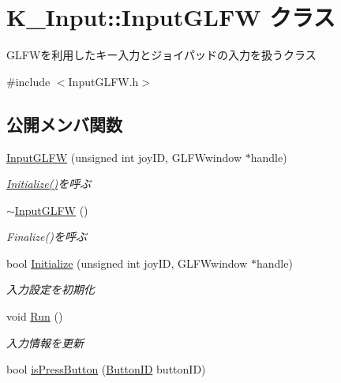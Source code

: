 \hypertarget{class_k___input_1_1_input_g_l_f_w}{}\section{K\+\_\+\+Input\+:\+:Input\+G\+L\+FW クラス}
\label{class_k___input_1_1_input_g_l_f_w}


G\+L\+F\+Wを利用したキー入力とジョイパッドの入力を扱うクラス  




{\ttfamily \#include $<$Input\+G\+L\+F\+W.\+h$>$}

\subsection*{公開メンバ関数}
\begin{DoxyCompactItemize}
\item 
\mbox{\hyperlink{class_k___input_1_1_input_g_l_f_w_a733179261d9b94d99ca3a0a60c93437c}{Input\+G\+L\+FW}} (unsigned int joy\+ID, G\+L\+F\+Wwindow $\ast$handle)
\begin{DoxyCompactList}\small\item\em \mbox{\hyperlink{class_k___input_1_1_input_g_l_f_w_adebfa33e196d75a37714a452622cf90e}{Initialize()}}を呼ぶ \end{DoxyCompactList}\item 
\mbox{\hyperlink{class_k___input_1_1_input_g_l_f_w_a5125b026d330c14dccdb0399e7b6d38d}{$\sim$\+Input\+G\+L\+FW}} ()
\begin{DoxyCompactList}\small\item\em Finalize()を呼ぶ \end{DoxyCompactList}\item 
bool \mbox{\hyperlink{class_k___input_1_1_input_g_l_f_w_adebfa33e196d75a37714a452622cf90e}{Initialize}} (unsigned int joy\+ID, G\+L\+F\+Wwindow $\ast$handle)
\begin{DoxyCompactList}\small\item\em 入力設定を初期化 \end{DoxyCompactList}\item 
void \mbox{\hyperlink{class_k___input_1_1_input_g_l_f_w_a2e6aca10a49dfac3a8d49143910e0a2a}{Run}} ()
\begin{DoxyCompactList}\small\item\em 入力情報を更新 \end{DoxyCompactList}\item 
bool \mbox{\hyperlink{class_k___input_1_1_input_g_l_f_w_aef09f80f0687dfe8f0463b79c95a7a3b}{is\+Press\+Button}} (\mbox{\hyperlink{namespace_k___input_a2a6df758ee5a36c29d234fe7a27beb2c}{Button\+ID}} button\+ID)

\end{DoxyCompactItemize}
